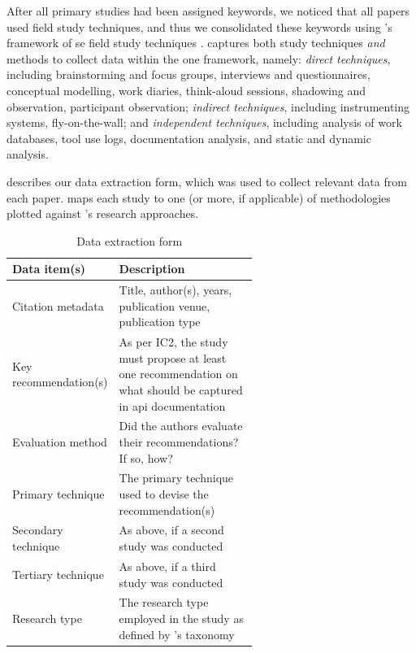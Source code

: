 After all primary studies had been assigned keywords, we noticed that all papers used field study techniques, and thus we consolidated these keywords using \citeauthor{Singer:2007tu}'s framework of \gls{se} field study techniques \citep{Singer:2007tu}. \citeauthor{Singer:2007tu} captures both study techniques \textit{and} methods to collect data within the one framework, namely: \textit{direct techniques}, including brainstorming and focus groups, interviews and questionnaires, conceptual modelling, work diaries, think-aloud sessions, shadowing and observation, participant observation; \textit{indirect techniques}, including instrumenting systems, fly-on-the-wall; and \textit{independent techniques}, including analysis of work databases, tool use logs, documentation analysis, and static and dynamic analysis. 

 describes our data extraction form, which was used to collect relevant data from each paper.  maps each study to one (or more, if applicable) of methodologies plotted against \citeauthor{Wieringa:2006vd}'s research approaches.

\begin{table}[tb]
  \caption[Data extraction in API documentation knowledge study]{Data extraction form}
  \label{esem2019:tab:extraction}
  \centering
  \begin{tabular}{l|p{0.6\linewidth}}
    \toprule
    \textbf{Data item(s)} &
    \textbf{Description}
    \\
    \midrule
    Citation metadata & Title, author(s), years, publication venue, publication type \\
    Key recommendation(s) & As per IC2, the study must propose at least one recommendation on what should be captured in \gls{api} documentation \\
    Evaluation method & Did the authors evaluate their recommendations? If so, how? \\
    Primary technique & The primary technique used to devise the recommendation(s) \\ 
    Secondary technique & As above, if a second study was conducted \\
    Tertiary technique & As above, if a third study was conducted \\
    Research type & The research type employed in the study as defined by \citeauthor{Wieringa:2006vd}'s taxonomy \\
    \bottomrule
  \end{tabular}
\end{table}

